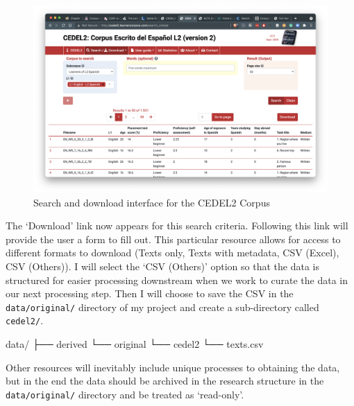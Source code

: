 \documentclass[
  letterpaper,
]{scrbook}
\newenvironment{Shaded}{\begin{snugshade}}{\end{snugshade}}
\newcommand{\ExtensionTok}[1]{\textcolor[rgb]{0.00,0.00,0.00}{#1}}
\newcommand{\NormalTok}[1]{\textcolor[rgb]{0.00,0.00,0.00}{#1}}
\begin{document}
\begin{figure}[h]

{\centering \includegraphics[width=9.28in,height=\textheight]{./figures/acquire-data/ad-cedel2-search-download.png}

}

\caption{\label{fig-ad-show-page-cedel2-2}Search and download interface
for the CEDEL2 Corpus}

\end{figure}

The `Download' link now appears for this search criteria. Following this
link will provide the user a form to fill out. This particular resource
allows for access to different formats to download (Texts only, Texts
with metadata, CSV (Excel), CSV (Others)). I will select the `CSV
(Others)' option so that the data is structured for easier processing
downstream when we work to curate the data in our next processing step.
Then I will choose to save the CSV in the \texttt{data/original/}
directory of my project and create a sub-directory called
\texttt{cedel2/}.

\begin{Shaded}
\begin{Highlighting}[]
\ExtensionTok{data/}
\ExtensionTok{├──}\NormalTok{ derived}
\ExtensionTok{└──}\NormalTok{ original}
    \ExtensionTok{└──}\NormalTok{ cedel2}
       \ExtensionTok{└──}\NormalTok{ texts.csv}
\end{Highlighting}
\end{Shaded}

Other resources will inevitably include unique processes to obtaining
the data, but in the end the data should be archived in the research
structure in the \texttt{data/original/} directory and be treated as
`read-only'.
\end{document}
